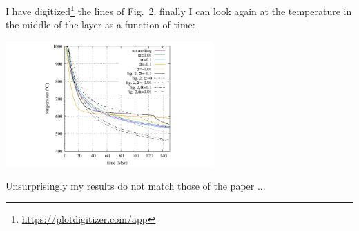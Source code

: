 I have digitized\footnote{\url{https://plotdigitizer.com/app}} the lines of Fig.~2.
finally I can look again at the temperature in the middle of the layer as a function of time:
\begin{center}
\includegraphics[width=8cm]{python_codes/fieldstone_169/results/nonlinear/midT.pdf}
\end{center}
Unsurprisingly my results do not match those of the paper ...


